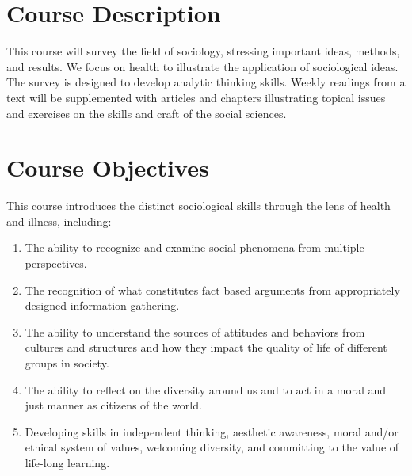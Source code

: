 \documentclass{tufte-book}
\begin{document}
\section{Course Description}
This course will survey the field of sociology, stressing important ideas, methods, and results. We focus on health to illustrate the application of sociological ideas. The survey is designed to develop analytic thinking skills. Weekly readings from a text will be supplemented with articles and chapters illustrating topical issues and exercises on the skills and craft of the social sciences.

\vspace{3mm}
\section{Course Objectives}
This course introduces the distinct sociological skills through the lens of health and illness, including:
\begin{enumerate}[leftmargin=!,labelindent=5pt]
\itemsep-.25em
\item The ability to recognize and examine social phenomena from multiple perspectives.
\item The recognition of what constitutes fact based arguments from appropriately designed information gathering.
\item The ability to understand the sources of attitudes and behaviors from cultures and structures and how they impact the quality of life of different groups in society.
\item The ability to reflect on the diversity around us and to act in a moral and just manner as citizens of the world.
\item Developing skills in independent thinking, aesthetic awareness, moral and/or ethical system of values, welcoming diversity, and committing to the value of life-long learning.
\end{enumerate}

\vspace{3mm}
\end{document}
